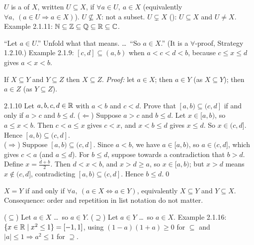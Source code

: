 \begin{key}[{Definition 2.1.6}]
$U$ is a  of $X$, written $U\subseteq X$, if $\forall a\in U,\ a\in X$ (equivalently $\forall a,\ (a\in U\Rightarrow a\in X)$). $U\nsubseteq X$: not a subset. $U\subsetneq X$ (): $U\subseteq X$ and $U\ne X$. Example 2.1.11: $\mathbb{N}\subseteq\mathbb{Z}\subseteq\mathbb{Q}\subseteq\mathbb{R}\subseteq\mathbb{C}$.
\end{key}
\begin{strategy}
``Let $a\in U$.'' Unfold what that means. \dots\ ``So $a\in X$.'' (It is a $\forall$-proof, Strategy 1.2.10.) Example 2.1.9: $[c,d]\subseteq(a,b)$ when $a<c<d<b$, because $c\le x\le d$ gives $a<x<b$.
\end{strategy}
\begin{result}
If $X\subseteq Y$ and $Y\subseteq Z$ then $X\subseteq Z$. \emph{Proof:} let $a\in X$; then $a\in Y$ (as $X\subseteq Y$); then $a\in Z$ (as $Y\subseteq Z$).
\end{result}

\begin{bookex}[essential]{2.1.10}
Let $a,b,c,d\in\mathbb{R}$ with $a<b$ and $c<d$. Prove that $[a,b)\subseteq(c,d]$ if and only if $a>c$ and $b\le d$.
\solution
($\Leftarrow$) Suppose $a>c$ and $b\le d$. Let $x\in[a,b)$, so $a\le x<b$. Then $c<a\le x$ gives $c<x$, and $x<b\le d$ gives $x\le d$. So $x\in(c,d]$. Hence $[a,b)\subseteq(c,d]$.\\
($\Rightarrow$) Suppose $[a,b)\subseteq(c,d]$. Since $a<b$, we have $a\in[a,b)$, so $a\in(c,d]$, which gives $c<a$ (and $a\le d$). For $b\le d$, suppose towards a contradiction that $b>d$. Define $x=\frac{d+b}2$. Then $d<x<b$, and $x>d\ge a$, so $x\in[a,b)$; but $x>d$ means $x\notin(c,d]$, contradicting $[a,b)\subseteq(c,d]$. Hence $b\le d$.\qed
\end{bookex}

\begin{result}
$X=Y$ if and only if $\forall a,\ (a\in X\Leftrightarrow a\in Y)$, equivalently $X\subseteq Y$ and $Y\subseteq X$. Consequence: order and repetition in list notation do not matter.
\end{result}
\begin{strategy}
($\subseteq$) Let $a\in X$ \dots\ so $a\in Y$. \quad ($\supseteq$) Let $a\in Y$ \dots\ so $a\in X$. \quad Example 2.1.16: $\{x\in\mathbb{R}\mid x^2\le1\}=[-1,1]$, using $(1-a)(1+a)\ge0$ for $\subseteq$ and $|a|\le1\Rightarrow a^2\le1$ for $\supseteq$.
\end{strategy}

